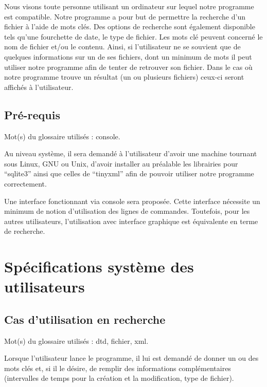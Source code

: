 \documentclass[a4paper,12pt]{report}
\begin{document}
Nous visons toute personne utilisant un ordinateur sur lequel notre programme est compatible. Notre programme a pour but de permettre la recherche d'un fichier à l'aide de mots clés. Des options de recherche sont également disponible tels qu'une fourchette de date, le type de fichier. Les mots clé peuvent concerné le nom de fichier et/ou le contenu. Ainsi, si l'utilisateur ne se souvient que de quelques informations sur un de ses fichiers, dont un minimum de mots il peut utiliser notre programme afin de tenter de retrouver son fichier. Dans le cas où notre programme trouve un résultat (un ou plusieurs fichiers) ceux-ci seront affichés à l'utilisateur.

\subsection{Pré-requis}
Mot(s) du glossaire utilisés : \gls{console}.

Au niveau système, il sera demandé à l'utilisateur d'avoir une machine tournant sous Linux, GNU ou Unix, d'avoir installer au préalable les librairies pour \enquote{sqlite3} ainsi que celles de \enquote{tinyxml} afin de pouvoir utiliser notre programme correctement.

Une interface fonctionnant via console sera proposée. Cette interface nécessite un minimum de notion d'utilisation des lignes de commandes. Toutefois, pour les autres utilisateurs, l'utilisation avec interface graphique est équivalente en terme de recherche.

\section{Spécifications système des utilisateurs}

\subsection{Cas d'utilisation en recherche}
Mot(s) du glossaire utilisés : \gls{dtd}, \gls{fichier}, \gls{xml}.

Lorsque l'utilisateur lance le programme, il lui est demandé de donner un ou des mots clés et, si il le désire, de remplir des informations complémentaires (intervalles de temps pour la création et la modification, type de fichier).
\end{document}
